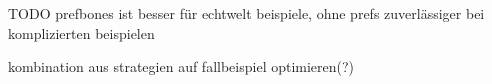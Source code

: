 TODO prefbones ist besser für echtwelt beispiele, ohne prefs zuverlässiger bei komplizierten beispielen

kombination aus strategien auf fallbeispiel optimieren(?)